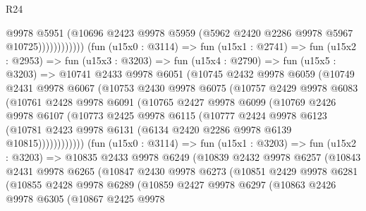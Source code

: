 \begin{lexlean}{R24}
\begin{coremodule}
                            @9978
                            @5951
                            (@10696
                              @2423
                              @9978
                              @5959
                              (@5962 @2420 @2286 @9978 @5967 @10725))))))))))))
        (fun (u15x0 : @3114) =>
        fun (u15x1 : @2741) =>
        fun (u15x2 : @2953) =>
        fun (u15x3 : @3203) =>
        fun (u15x4 : @2790) =>
        fun (u15x5 : @3203) =>
        @10741
          @2433
          @9978
          @6051
          (@10745
            @2432
            @9978
            @6059
            (@10749
              @2431
              @9978
              @6067
              (@10753
                @2430
                @9978
                @6075
                (@10757
                  @2429
                  @9978
                  @6083
                  (@10761
                    @2428
                    @9978
                    @6091
                    (@10765
                      @2427
                      @9978
                      @6099
                      (@10769
                        @2426
                        @9978
                        @6107
                        (@10773
                          @2425
                          @9978
                          @6115
                          (@10777
                            @2424
                            @9978
                            @6123
                            (@10781
                              @2423
                              @9978
                              @6131
                              (@6134 @2420 @2286 @9978 @6139 @10815))))))))))))
        (fun (u15x0 : @3114) =>
        fun (u15x1 : @3203) =>
        fun (u15x2 : @3203) =>
        @10835
          @2433
          @9978
          @6249
          (@10839
            @2432
            @9978
            @6257
            (@10843
              @2431
              @9978
              @6265
              (@10847
                @2430
                @9978
                @6273
                (@10851
                  @2429
                  @9978
                  @6281
                  (@10855
                    @2428
                    @9978
                    @6289
                    (@10859
                      @2427
                      @9978
                      @6297
                      (@10863
                        @2426
                        @9978
                        @6305
                        (@10867
                          @2425
                          @9978

\end{coremodule}
\end{lexlean}
